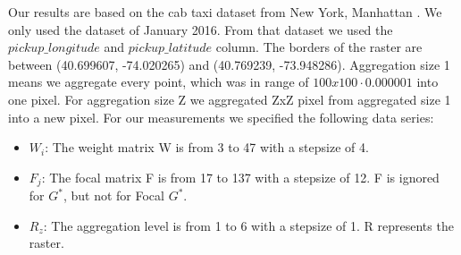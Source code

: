 \documentclass{itatnew}
\begin{document}
Our results are based on the cab taxi dataset from New York, Manhattan \cite{TODO}. 
We only used the dataset of January 2016. From that
dataset we used the $pickup\_longitude$ and $pickup\_latitude$ column. 
The borders of the raster are between (40.699607, -74.020265) and (40.769239, -73.948286). 
Aggregation size 1 means we aggregate every point, which was in range of $100x100 \cdot 0.000001$ into one pixel. 
For aggregation size Z we aggregated ZxZ pixel from aggregated size 1 into a new pixel.
%
For our measurements we specified the following data series:
\begin{itemize}
 \item $W_i$: The weight matrix W is from 3 to 47 with a stepsize of 4.
 \item $F_j$: The focal matrix F is from  17 to 137 with a stepsize of 12. F is ignored for $G^*$, but not for Focal $G^*$.
 \item $R_z$: The aggregation level is from 1 to 6 with a stepsize of 1. R represents the raster.
\end{itemize}
\end{document}
